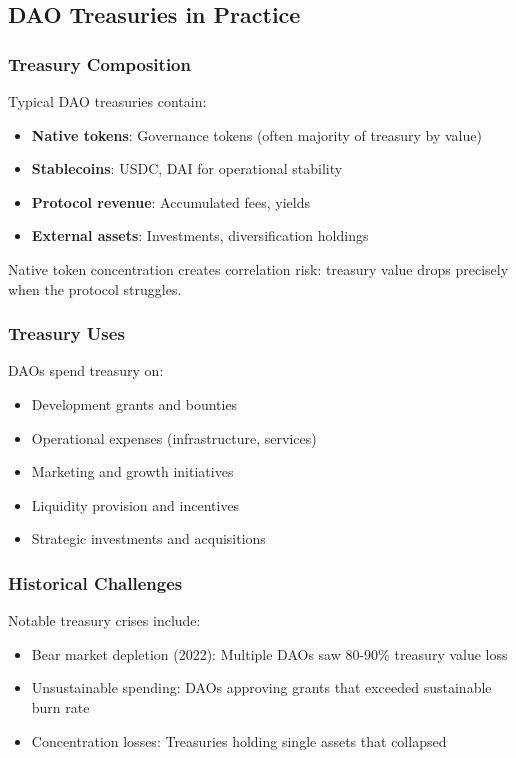 
\subsection{DAO Treasuries in Practice}

\subsubsection{Treasury Composition}

Typical DAO treasuries contain:
\begin{itemize}
    \item \textbf{Native tokens}: Governance tokens (often majority of treasury by value)
    \item \textbf{Stablecoins}: USDC, DAI for operational stability
    \item \textbf{Protocol revenue}: Accumulated fees, yields
    \item \textbf{External assets}: Investments, diversification holdings
\end{itemize}

Native token concentration creates correlation risk: treasury value drops precisely when the protocol struggles.

\subsubsection{Treasury Uses}

DAOs spend treasury on:
\begin{itemize}
    \item Development grants and bounties
    \item Operational expenses (infrastructure, services)
    \item Marketing and growth initiatives
    \item Liquidity provision and incentives
    \item Strategic investments and acquisitions
\end{itemize}

\subsubsection{Historical Challenges}

Notable treasury crises include:
\begin{itemize}
    \item Bear market depletion (2022): Multiple DAOs saw 80-90\% treasury value loss
    \item Unsustainable spending: DAOs approving grants that exceeded sustainable burn rate
    \item Concentration losses: Treasuries holding single assets that collapsed
\end{itemize}

